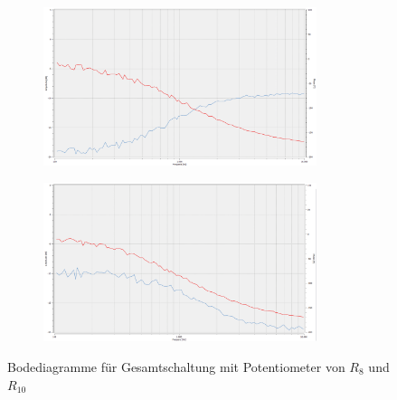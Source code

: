 \begin{figure}[h]
\begin{subfigure}{.5\textwidth}
  \label{1_0SB}
\end{subfigure}
\begin{subfigure}{.5\textwidth}
  \centering
  \includegraphics[width=8cm]{pics/30_60Steckbrett}
  \label{3_6SB}
\end{subfigure}%
\begin{subfigure}{.5\textwidth}
  \centering
  \includegraphics[width=8cm]{pics/60_30Steckbrett}
  \label{6_3SB}
\end{subfigure}

\caption{Bodediagramme für Gesamtschaltung mit Potentiometer von $R_{8}$ und $R_{10}$}
\end{figure}
\newpage

